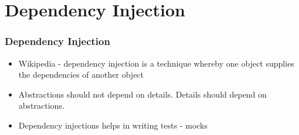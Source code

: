 \section{Dependency Injection}

\begin{frame}[fragile]
    \frametitle{Dependency Injection}
    \begin{itemize}
        \item Wikipedia - dependency injection is a technique whereby one object supplies the dependencies of another object
        \item Abstractions should not depend on details. Details should depend on abstractions.
        \item Dependency injections helps in writing tests - mocks
    \end{itemize}
\end{frame}